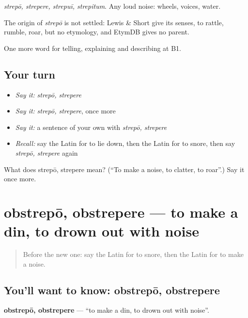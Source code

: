 \emph{strepō, strepere, strepuī, strepitum}. Any loud noise: wheels, voices, water.

\begin{cousinweb}
The origin of \emph{strepō} is not settled: Lewis \& Short give its senses, to rattle, rumble, roar, but no etymology, and EtymDB gives no parent.
\end{cousinweb}

\begin{grammarlens}[title={What you've built}]
One more word for telling, explaining and describing at B1.
\end{grammarlens}

\subsection*{Your turn}
\begin{itemize}
\raggedright
  \item \emph{Say it:} \emph{strepō, strepere}
  \item \emph{Say it:} \emph{strepō, strepere}, once more
  \item \emph{Say it:} a sentence of your own with \emph{strepō, strepere}
  \item \emph{Recall:} say the Latin for to lie down, then the Latin for to snore, then say \emph{strepō, strepere} again
\end{itemize}

\begin{tcolorbox}[breakable,colback=teal!4,colframe=teal!35!black,title={Before you move on}]
What does strepō, strepere mean? (\textquotedblleft{}To make a noise, to clatter, to roar\textquotedblright{}.) Say it once more.
\end{tcolorbox}
\section[obstrepō, obstrepere]{obstrepō, obstrepere — to make a din, to drown out with noise}

\label{lesson:LA-C448-obstrepo}



\begin{quote}
Before the new one: say the Latin for to snore, then the Latin for to make a noise.
\end{quote}

\subsection*{You'll want to know: obstrepō, obstrepere}
\textbf{obstrepō, obstrepere} — \textquotedblleft{}to make a din, to drown out with noise\textquotedblright{}.

